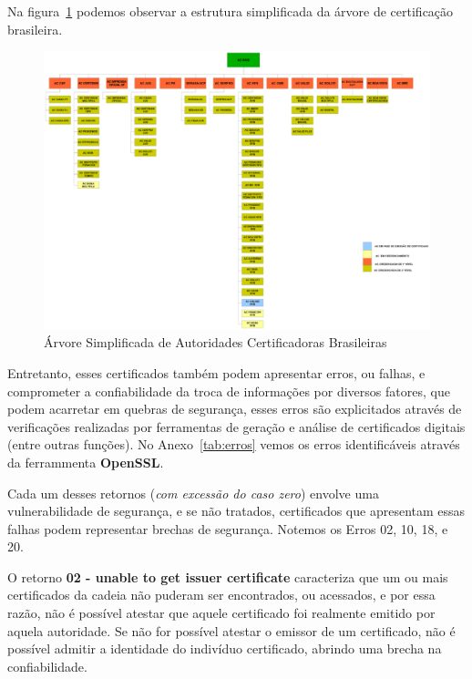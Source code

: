 	Na figura~\ref{fig:img08} podemos observar a estrutura simplificada da árvore de certificação brasileira.

	\begin{figure}[!ht]
		\centering
		\includegraphics[keepaspectratio=true,scale=0.7]{figuras/certBR.eps}
		\caption{Árvore Simplificada de Autoridades Certificadoras Brasileiras \cite{itiICPBRASIL}}
		\label{fig:img08}
	\end{figure}

	Entretanto, esses certificados também podem apresentar erros, ou falhas, e comprometer a confiabilidade da troca de informações por diversos fatores, que podem acarretar em quebras de segurança, esses erros são explicitados através de verificações realizadas por ferramentas de geração e análise de certificados digitais (entre outras funções). No Anexo~\ref{tab:erros} vemos os erros identificáveis através da ferrammenta \textbf{OpenSSL}. 

	Cada um desses retornos (\textit{com excessão do caso zero}) envolve uma vulnerabilidade de segurança, e se não tratados, certificados que apresentam essas falhas podem representar brechas de segurança. Notemos os Erros 02, 10, 18, e 20.

	O retorno \textbf{02 - unable to get issuer certificate} caracteriza que um ou mais certificados da cadeia não puderam ser encontrados, ou acessados, e por essa razão, não é possível atestar que aquele certificado foi realmente emitido por aquela autoridade. Se não for possível atestar o emissor de um certificado, não é possível admitir a identidade do indivíduo certificado, abrindo uma brecha na confiabilidade.

